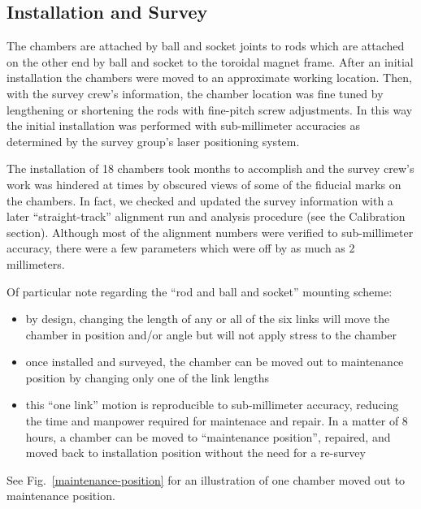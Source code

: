 \subsection{Installation and Survey}

The chambers are attached by ball and socket joints to rods which are attached
on the other end by ball and socket to the toroidal magnet frame.
After an initial installation the chambers were moved to an approximate
working location.  Then, with the survey crew's information, the chamber location
was fine tuned by lengthening or shortening the rods with fine-pitch screw adjustments.
In this way the initial installation was performed with sub-millimeter accuracies as
determined by the survey group's laser positioning system.

The installation of 18 chambers took months to accomplish and the survey crew's work
was hindered at times by obscured views of some of the fiducial marks on the 
chambers.  In fact, we checked and updated the survey information with a later 
``straight-track'' alignment run and analysis procedure (see the Calibration section).
Although most of the alignment numbers were verified to sub-millimeter accuracy, there
were a few parameters which were off by as much as 2 millimeters.

Of particular note regarding the ``rod and ball and socket'' mounting scheme:
\begin{itemize}
\item by design, changing the length of any or all of the six links will
move the chamber in position and/or angle but will not apply stress to the
chamber
\item once installed and surveyed, the chamber can be moved out to maintenance
position by changing only one of the link lengths
\item this ``one link'' motion is reproducible to sub-millimeter accuracy, reducing the time
and manpower required for maintenace and repair.  In a matter of 8 hours, a chamber 
can be moved to ``maintenance position'', repaired, and moved back to installation
position without the need for a re-survey
\end{itemize}
See Fig.~\ref{maintenance-position} for an illustration of one chamber moved out to
maintenance position.

